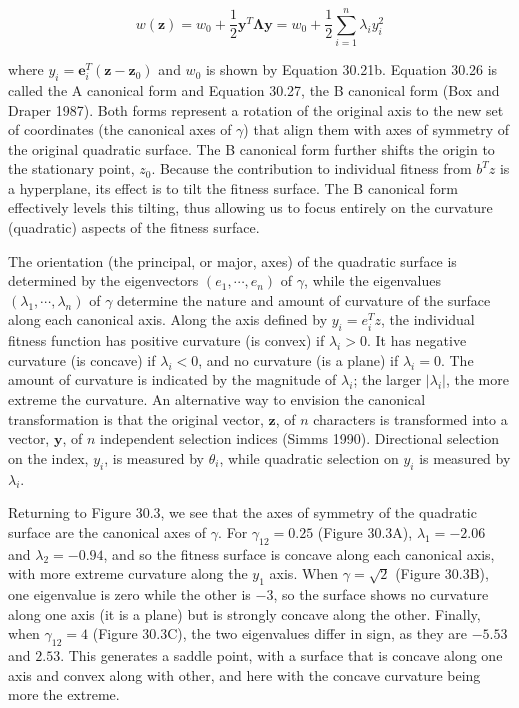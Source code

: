 \documentclass{article}
\begin{document}
\begin{equation}
w(\mathbf{z})=w_{0}+\frac{1}{2}\mathbf{y}^{T}\mathbf{\Lambda}\mathbf{y}=w_{0}+\frac{1}{2}\sum_{i=1}^{n}\lambda_{i}y_{i}^{2}
\tag{30.27}
\label{eq:30_27}
\end{equation}

where  $ y_i = \mathbf{e}_i^T(\mathbf{z} - \mathbf{z}_0) $ and  $ w_0 $ is shown by Equation 30.21b. Equation 30.26 is called the A canonical form and Equation 30.27, the B canonical form (Box and Draper 1987). Both forms represent a rotation of the original axis to the new set of coordinates (the canonical axes of  $ \gamma $) that align them with axes of symmetry of the original quadratic surface. The B canonical form further shifts the origin to the stationary point,  $ z_0 $. Because the contribution to individual fitness from  $ b^T z $ is a hyperplane, its effect is to tilt the fitness surface. The B canonical form effectively levels this tilting, thus allowing us to focus entirely on the curvature (quadratic) aspects of the fitness surface.

The orientation (the principal, or major, axes) of the quadratic surface is determined by the eigenvectors  $ (e_1, \cdots, e_n) $ of  $ \gamma $, while the eigenvalues  $ (\lambda_1, \cdots, \lambda_n) $ of  $ \gamma $ determine the nature and amount of curvature of the surface along each canonical axis. Along the axis defined by  $ y_i = e_i^T z $, the individual fitness function has positive curvature (is convex) if  $ \lambda_i > 0 $. It has negative curvature (is concave) if  $ \lambda_i < 0 $, and no curvature (is a plane) if  $ \lambda_i = 0 $. The amount of curvature is indicated by the magnitude of  $ \lambda_i $; the larger  $ |\lambda_i| $, the more extreme the curvature. An alternative way to envision the canonical transformation is that the original vector,  $ \mathbf{z} $, of  $ n $ characters is transformed into a vector,  $ \mathbf{y} $, of  $ n $ independent selection indices (Simms 1990). Directional selection on the index,  $ y_i $, is measured by  $ \theta_i $, while quadratic selection on  $ y_i $ is measured by  $ \lambda_i $.

Returning to Figure 30.3, we see that the axes of symmetry of the quadratic surface are the canonical axes of $\gamma$. For $\gamma_{12}=0.25$ (Figure 30.3A), $\lambda_{1}=-2.06$ and $\lambda_{2}=-0.94$, and so the fitness surface is concave along each canonical axis, with more extreme curvature along the $y_{1}$ axis. When $\gamma=\sqrt{2}$ (Figure 30.3B), one eigenvalue is zero while the other is $-3$, so the surface shows no curvature along one axis (it is a plane) but is strongly concave along the other. Finally, when $\gamma_{12}=4$ (Figure 30.3C), the two eigenvalues differ in sign, as they are $-5.53$ and $2.53$. This generates a saddle point, with a surface that is concave along one axis and convex along with other, and here with the concave curvature being more the extreme.
\end{document}
